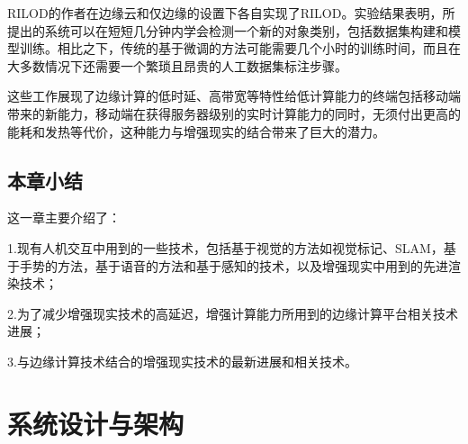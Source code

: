 RILOD的作者在边缘云和仅边缘的设置下各自实现了RILOD。实验结果表明，所提出的系统可以在短短几分钟内学会检测一个新的对象类别，包括数据集构建和模型训练。相比之下，传统的基于微调的方法可能需要几个小时的训练时间，而且在大多数情况下还需要一个繁琐且昂贵的人工数据集标注步骤。

这些工作展现了边缘计算的低时延、高带宽等特性给低计算能力的终端包括移动端带来的新能力，移动端在获得服务器级别的实时计算能力的同时，无须付出更高的能耗和发热等代价，这种能力与增强现实的结合带来了巨大的潜力。

\section{本章小结}
这一章主要介绍了：

1.现有人机交互中用到的一些技术，包括基于视觉的方法如视觉标记、SLAM，基于手势的方法，基于语音的方法和基于感知的技术，以及增强现实中用到的先进渲染技术；

2.为了减少增强现实技术的高延迟，增强计算能力所用到的边缘计算平台相关技术进展；

3.与边缘计算技术结合的增强现实技术的最新进展和相关技术。


\chapter{系统设计与架构}
\label{chap:architec}

